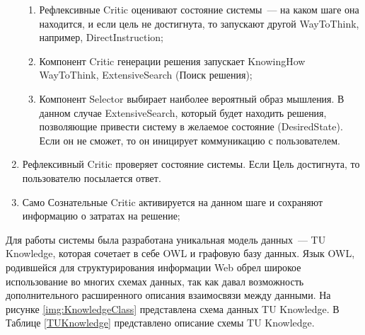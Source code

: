 \begin{enumerate}
\begin{enumerate}
	\item Рефлексивные Critic оценивают состояние системы~--- на каком шаге она находится, и если цель не достигнута, то запускают другой WayToThink, например, DirectInstruction;
	\item Компонент Critic генерации решения запускает KnowingHow WayToThink, ExtensiveSearch (Поиск решения);
	\item Компонент Selector выбирает наиболее вероятный образ мышления. В данном случае ExtensiveSearch, который будет находить решения, позволяющие привести систему в желаемое состояние (DesiredState). Если он не сможет, то он иницирует коммуникацию с пользователем. 
 \end{enumerate}
	 \item Рефлексивный Critic проверяет состояние системы. Если Цель достигнута, то пользователю посылается ответ.
	 \item Само Сознательные Critic активируется на данном шаге и сохраняют информацию о затратах на решение;
  \end{enumerate}\par
Для работы системы была разработана уникальная модель данных~--- TU Knowledge, которая сочетает в себе OWL и графовую базу данных. Язык OWL, родившейся для структурирования информации Web обрел широкое использование во многих схемах данных, так как давал возможность дополнительного расширенного описания взаимосвязи между данными. На рисунке \ref{img:KnowledgeClass} представлена схема данных TU Knowledge. В Таблице \ref{TUKnowledge} представлено описание схемы TU Knowledge.


